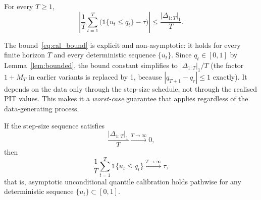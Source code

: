 \begin{theorem}\label{thm:calibration}
For every $T \geq 1$,
\begin{equation}\label{eq:cal_bound}
    \left| \frac{1}{T} \sum_{t=1}^{T} \bigl( \mathds{1}\{u_t \leq q_t\} - \tau \bigr) \right| \leq \frac{|\Delta_{1:T}|_1}{T}.
\end{equation}
\end{theorem}

The bound~\eqref{eq:cal_bound} is explicit and non-asymptotic: it holds for every finite horizon $T$ and every deterministic sequence $\{u_t\}$. Since $q_t \in [0,1]$ by Lemma~\ref{lem:bounded}, the bound constant simplifies to $|\Delta_{1:T}|_1 / T$ (the factor $1 + M_T$ in earlier variants is replaced by 1, because $|q_{T+1} - q_r| \leq 1$ exactly). It depends on the data only through the step-size schedule, not through the realised PIT values. This makes it a \emph{worst-case} guarantee that applies regardless of the data-generating process.

\begin{corollary}\label{cor:asymptotic}
If the step-size sequence satisfies
\begin{equation}\label{eq:stepsize_condition}
    \frac{|\Delta_{1:T}|_1}{T} \xrightarrow{T \to \infty} 0,
\end{equation}
then
\begin{equation}
    \frac{1}{T} \sum_{t=1}^{T} \mathds{1}\{u_t \leq q_t\} \xrightarrow{T \to \infty} \tau,
\end{equation}
that is, asymptotic unconditional quantile calibration holds pathwise for any deterministic sequence $\{u_t\} \subset [0,1]$.
\end{corollary}


